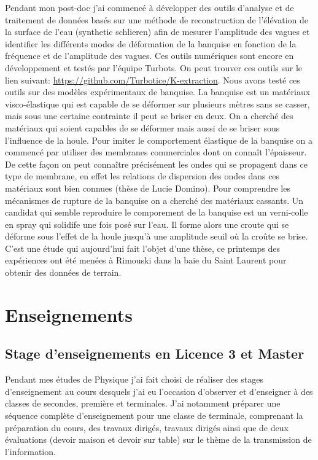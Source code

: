 \documentclass[french, 10pt]{article}
\begin{document}
Pendant mon post-doc j'ai commencé à développer des outils d'analyse et de traitement de données basés sur une méthode de reconstruction de l'élévation de la surface de l'eau (synthetic schlieren) afin de mesurer l'amplitude des vagues et identifier les différents modes de déformation de la banquise en fonction de la fréquence et de l'amplitude des vagues. Ces outils numériques sont encore en développement et testés par l'équipe Turbots. On peut trouver ces outils sur le lien suivant: \url{https://github.com/Turbotice/K-extraction}. Nous avons testé ces outils sur des modèles expérimentaux de \og{}banquise\fg{}. La banquise est un matériaux visco-élastique qui est capable de se déformer sur plusieurs mètres sans se casser, mais sous une certaine contrainte il peut se briser en deux. On a cherché des matériaux qui soient capables de se déformer mais aussi de se briser sous l'influence de la houle. Pour imiter le comportement élastique de la banquise on a commencé par utiliser des membranes commerciales dont on connaît l'épaisseur. De cette façon on peut connaître précisément les ondes qui se propagent dans ce type de membrane, en effet les relations de dispersion des ondes dans ces matériaux sont bien connues (thèse de Lucie Domino). Pour comprendre les mécanismes de rupture de la banquise on a cherché des matériaux cassants. Un candidat qui semble reproduire le comporement de la banquise est un verni-colle en spray qui solidife une fois posé sur l'eau. Il forme alors une croute qui se déforme sous l'effet de la houle jusqu'à une amplitude seuil où la croûte se brise. C'est une étude qui aujourd'hui fait l'objet d'une thèse, ce printemps des expériences ont été menées à Rimouski dans la baie du Saint Laurent pour obtenir des données de terrain.

\section{Enseignements}

\subsection{Stage d'enseignements en Licence 3 et Master}


Pendant mes études de Physique j'ai fait choisi de réaliser des stages d'enseignement au cours desquels j'ai eu l'occasion d'observer et d'enseigner à des classes de secondes, première et terminales. J'ai notamment préparer une séquence complète d'enseignement pour une classe de terminale, comprenant la préparation du cours, des travaux dirigés, travaux dirigés ainsi que de deux évaluations (devoir maison et devoir sur table) sur le thème de la transmission de l'information. 
\end{document}
